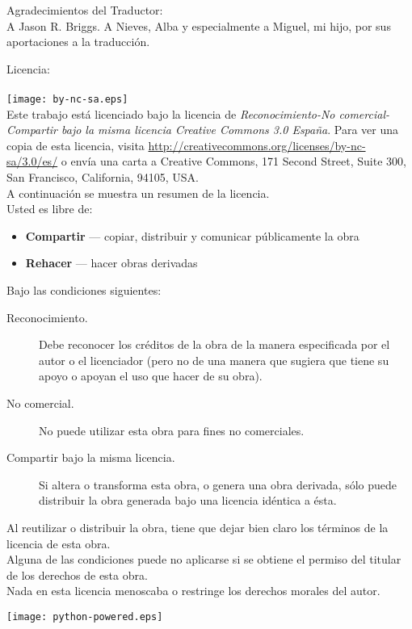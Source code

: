 \noindent
Agradecimientos del Traductor:\\
A Jason R. Briggs. A Nieves, Alba y especialmente a Miguel, mi hijo, por sus aportaciones a la traducción.

\noindent
Licencia:\\
\\
\texttt{[image: by-nc-sa.eps]}\\
Este trabajo está licenciado bajo la licencia de \emph{Reconocimiento-No comercial-Compartir bajo la misma licencia Creative Commons 3.0 España}. Para ver una copia de esta licencia, visita \href{http://creativecommons.org/licenses/by-nc-sa/3.0/es/}{http://creativecommons.org/licenses/by-nc-sa/3.0/es/} o envía una carta a Creative Commons, 171 Second Street, Suite 300, San Francisco, California, 94105, USA.\\

\noindent
A continuación se muestra un resumen de la licencia.\\

\noindent
Usted es libre de:
\begin{itemize}
 \item \textbf{Compartir} — copiar, distribuir y comunicar públicamente la obra 
 \item \textbf{Rehacer} — hacer obras derivadas
\end{itemize}
\noindent
Bajo las condiciones siguientes:
\begin{description}
 \item[Reconocimiento.] Debe reconocer los créditos de la obra de la manera especificada por el autor o el licenciador (pero no de una manera que sugiera que tiene su apoyo o apoyan el uso que hacer de su obra).
 \item[No comercial.] No puede utilizar esta obra para fines no comerciales.
 \item[Compartir bajo la misma licencia.] Si altera o transforma esta obra, o genera una obra derivada, sólo puede distribuir la obra generada bajo una licencia idéntica a ésta. 
\end{description}

\noindent
Al reutilizar o distribuir la obra, tiene que dejar bien claro los términos de la licencia de esta obra.\\

\noindent
Alguna de las condiciones puede no aplicarse si se obtiene el permiso del titular de los derechos de esta obra.\\

\noindent
Nada en esta licencia menoscaba o restringe los derechos morales del autor.\\

\vspace*{4cm}
\begin{center}
\texttt{[image: python-powered.eps]}
\end{center}

\mainmatter

\pagestyle{plain}

\tableofcontents
